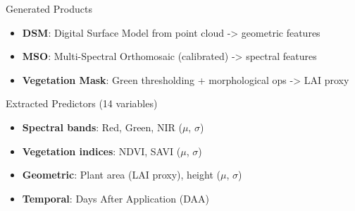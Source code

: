\documentclass[aspectratio=43]{beamer}
\begin{document}
\begin{frame}
\begin{columns}
        \begin{column}{0.5\textwidth}
            \begin{block}{Generated Products}
                \scriptsize
                \begin{itemize}
                    \item \textbf{DSM}: Digital Surface Model from point cloud -> geometric features
                    \item \textbf{MSO}: Multi-Spectral Orthomosaic (calibrated) -> spectral features
                    \item \textbf{Vegetation Mask}: Green thresholding + morphological ops -> LAI proxy
                \end{itemize}
            \end{block}
            \begin{block}{Extracted Predictors (14 variables)}
                \scriptsize
                \begin{itemize}
                    \item \textbf{Spectral bands}: Red, Green, NIR (\ensuremath{\mu}, \ensuremath{\sigma})
                    \item \textbf{Vegetation indices}: NDVI, SAVI (\ensuremath{\mu}, \ensuremath{\sigma})
                    \item \textbf{Geometric}: Plant area (LAI proxy), height (\ensuremath{\mu}, \ensuremath{\sigma})
                    \item \textbf{Temporal}: Days After Application (DAA)
                \end{itemize}
            \end{block}
        \end{column}
    \end{columns}
\end{frame}
\end{document}
